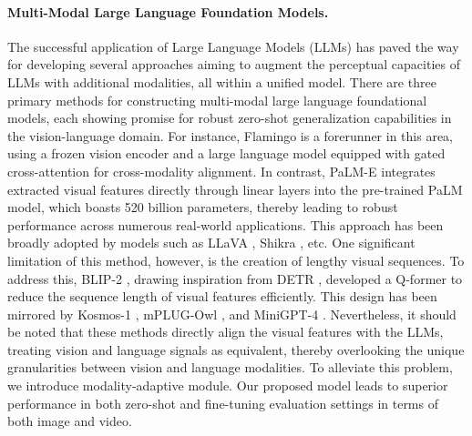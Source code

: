 \documentclass[10pt,twocolumn,letterpaper]{article}
\begin{document}
\paragraph{Multi-Modal Large Language Foundation Models.}
The successful application of Large Language Models (LLMs) has paved the way for developing several approaches aiming to augment the perceptual capacities of LLMs with additional modalities, all within a unified model. There are three primary methods for constructing multi-modal large language foundational models, each showing promise for robust zero-shot generalization capabilities in the vision-language domain. For instance, Flamingo \cite{alayrac2022flamingo} is a forerunner in this area, using a frozen vision encoder and a large language model equipped with gated cross-attention for cross-modality alignment. In contrast, PaLM-E \cite{Driess2023PaLME} integrates extracted visual features directly through linear layers into the pre-trained PaLM \cite{Chowdhery2022PaLM} model, which boasts 520 billion parameters, thereby leading to robust performance across numerous real-world applications. This approach has been broadly adopted by models such as LLaVA \cite{Liu2023Llava}, Shikra \cite{Chen2023Shikra}, etc. One significant limitation of this method, however, is the creation of lengthy visual sequences. To address this, BLIP-2 \cite{Li2023BLIP2}, drawing inspiration from DETR \cite{carion2020detr}, developed a Q-former to reduce the sequence length of visual features efficiently. This design has been mirrored by Kosmos-1 \cite{Huang2023Kosmos1}, mPLUG-Owl \cite{ye2023mplugowl}, and MiniGPT-4 \cite{Zhu2023MiniGPT4}. Nevertheless, it should be noted that these methods directly align the visual features with the LLMs, treating vision and language signals as equivalent, thereby overlooking the unique granularities between vision and language modalities. To alleviate this problem, we introduce modality-adaptive module. Our proposed model leads to superior performance in both zero-shot and fine-tuning evaluation settings in terms of both image and video.

\vspace{-1ex}
\end{document}
